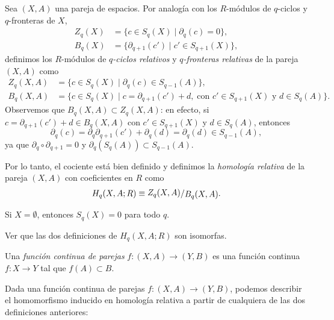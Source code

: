 \begin{definicion}
Sea $(X, A)$ una pareja de espacios. Por analogía con los $R$-módulos de $q$-ciclos y $q$-fronteras de $X$,
\begin{align*}
Z_q(X) &= \{ c \in S_q(X) \mid \partial_q(c) = 0 \}, \\
B_q(X) &= \{ \partial_{q+1}(c') \mid c' \in S_{q+1}(X) \},
\end{align*}
definimos los $R$-módulos de \textit{$q$-ciclos relativos} y \textit{$q$-fronteras relativas} de la pareja $(X, A)$ como
\begin{align*}
Z_q(X, A) &= \{ c \in S_q(X) \mid \partial_q(c) \in S_{q-1}(A) \}, \\
B_q(X, A) &= \{ c \in S_q(X) \mid c = \partial_{q+1}(c') + d, \; \text{con } c' \in S_{q+1}(X) \text{ y } d \in S_q(A) \}.
\end{align*}
Observemos que $B_q(X, A) \subset Z_q(X, A)$: en efecto, si $c = \partial_{q+1}(c') + d \in B_q(X, A)$ con $c' \in S_{q+1}(X)$ y $d \in S_q(A)$, entonces
\[
\partial_q(c) = \partial_q \partial_{q+1}(c') + \partial_q(d) = \partial_q(d) \in S_{q-1}(A),
\]
ya que $\partial_q \circ \partial_{q+1} = 0$ y $\partial_q(S_q(A)) \subset S_{q-1}(A)$.

Por lo tanto, el cociente está bien definido y definimos la \textit{homología relativa} de la pareja $(X, A)$ con coeficientes en $R$ como
\[
H_q(X, A; R) \equiv \raisebox{0.2ex}{$Z_q(X, A)$} / \raisebox{-0.2ex}{$B_q(X, A)$}.
\]
\end{definicion}

\begin{nota}
Si $X = \emptyset$, entonces $S_q(X) = 0$ para todo $q$.
\end{nota}

\begin{ejercicio}
Ver que las dos definiciones de $H_q(X, A; R)$ son isomorfas.
\end{ejercicio}

\begin{definicion}
Una \textit{función continua de parejas} $f \colon (X, A) \to (Y, B)$ es una función continua $f \colon X \to Y$ tal que $f(A) \subset B$.
\end{definicion}

Dada una función continua de parejas $f \colon (X, A) \to (Y, B)$, podemos describir el homomorfismo inducido en homología relativa a partir de cualquiera de las dos definiciones anteriores:

